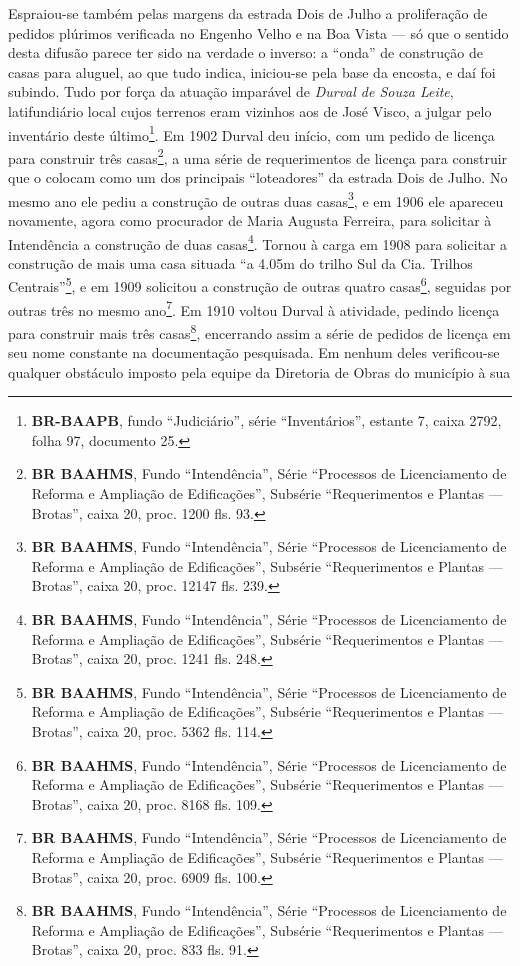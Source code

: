Espraiou-se também pelas margens da estrada Dois de Julho a proliferação de pedidos plúrimos verificada no Engenho Velho e na Boa Vista --- só que o sentido desta difusão parece ter sido na verdade o inverso: a ``onda'' de construção de casas para aluguel, ao que tudo indica, iniciou-se pela base da encosta, e daí foi subindo. Tudo por força da atuação imparável de \textit{Durval de Souza Leite}, latifundiário local cujos terrenos eram vizinhos aos de José Visco, a julgar pelo inventário deste último\footnote{\textbf{BR-BAAPB}, fundo ``Judiciário'', série ``Inventários'', estante 7, caixa 2792, folha 97, documento 25.}. Em 1902 Durval deu início, com um pedido de licença para construir três casas\footnote{\textbf{BR BAAHMS}, Fundo ``Intendência'', Série ``Processos de Licenciamento de Reforma e Ampliação de Edificações'', Subsérie ``Requerimentos e Plantas --- Brotas'', caixa 20, proc. 1200 fls. 93.}, a uma série de requerimentos de licença para construir que o colocam como um dos principais ``loteadores'' da estrada Dois de Julho. No mesmo ano ele pediu a construção de outras duas casas\footnote{\textbf{BR BAAHMS}, Fundo ``Intendência'', Série ``Processos de Licenciamento de Reforma e Ampliação de Edificações'', Subsérie ``Requerimentos e Plantas --- Brotas'', caixa 20, proc. 12147 fls. 239.}, e em 1906 ele apareceu novamente, agora como procurador de Maria Augusta Ferreira, para solicitar à Intendência a construção de duas casas\footnote{\textbf{BR BAAHMS}, Fundo ``Intendência'', Série ``Processos de Licenciamento de Reforma e Ampliação de Edificações'', Subsérie ``Requerimentos e Plantas --- Brotas'', caixa 20, proc. 1241 fls. 248.}. Tornou à carga em 1908 para solicitar a construção de mais uma casa situada ``a 4.05m do trilho Sul da Cia. Trilhos Centrais''\footnote{\textbf{BR BAAHMS}, Fundo ``Intendência'', Série ``Processos de Licenciamento de Reforma e Ampliação de Edificações'', Subsérie ``Requerimentos e Plantas --- Brotas'', caixa 20, proc. 5362 fls. 114.}, e em 1909 solicitou a construção de outras quatro casas\footnote{\textbf{BR BAAHMS}, Fundo ``Intendência'', Série ``Processos de Licenciamento de Reforma e Ampliação de Edificações'', Subsérie ``Requerimentos e Plantas --- Brotas'', caixa 20, proc. 8168 fls. 109.}, seguidas por outras três no mesmo ano\footnote{\textbf{BR BAAHMS}, Fundo ``Intendência'', Série ``Processos de Licenciamento de Reforma e Ampliação de Edificações'', Subsérie ``Requerimentos e Plantas --- Brotas'', caixa 20, proc. 6909 fls. 100.}. Em 1910 voltou Durval à atividade, pedindo licença para construir mais três casas\footnote{\textbf{BR BAAHMS}, Fundo ``Intendência'', Série ``Processos de Licenciamento de Reforma e Ampliação de Edificações'', Subsérie ``Requerimentos e Plantas --- Brotas'', caixa 20, proc. 833 fls. 91.}, encerrando assim a série de pedidos de licença em seu nome constante na documentação pesquisada. Em nenhum deles verificou-se qualquer obstáculo imposto pela equipe da Diretoria de Obras do município à sua 